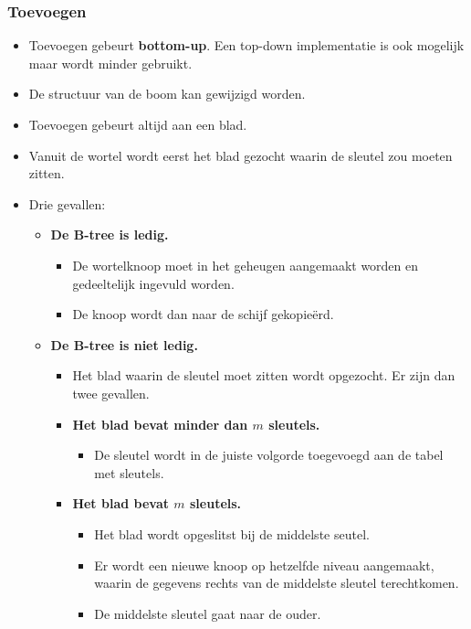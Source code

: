 \subsubsection{Toevoegen}
\begin{itemize}
    \item Toevoegen gebeurt \textbf{bottom-up}. Een top-down implementatie is ook mogelijk maar wordt minder gebruikt.
    \item De structuur van de boom kan gewijzigd worden.
    \item Toevoegen gebeurt altijd aan een blad.
    \item Vanuit de wortel wordt eerst het blad gezocht waarin de sleutel zou moeten zitten.
    \item Drie gevallen:
    \begin{itemize}
        \item \textbf{De B-tree is ledig.}
        \begin{itemize}
            \item De wortelknoop moet in het geheugen aangemaakt worden en gedeeltelijk ingevuld worden.
            \item De knoop wordt dan naar de schijf gekopieërd.
        \end{itemize}
        \item \textbf{De B-tree is niet ledig.}
        \begin{itemize}
            \item Het blad waarin de sleutel moet zitten wordt opgezocht. Er zijn dan twee gevallen.
        \end{itemize}
        \begin{itemize}
            \item \textbf{Het blad bevat minder dan $m$ sleutels.}
            \begin{itemize}
                \item De sleutel wordt in de juiste volgorde toegevoegd aan de tabel met sleutels.
            \end{itemize}
            \item \textbf{Het blad bevat $m$ sleutels.}
            \begin{itemize}
                \item Het blad wordt opgeslitst bij de middelste seutel.
                \item Er wordt een nieuwe knoop op hetzelfde niveau aangemaakt, waarin de gegevens rechts van de middelste sleutel terechtkomen.
                \item De middelste sleutel gaat naar de ouder.

\end{itemize}
\end{itemize}
\end{itemize}
\end{itemize}
